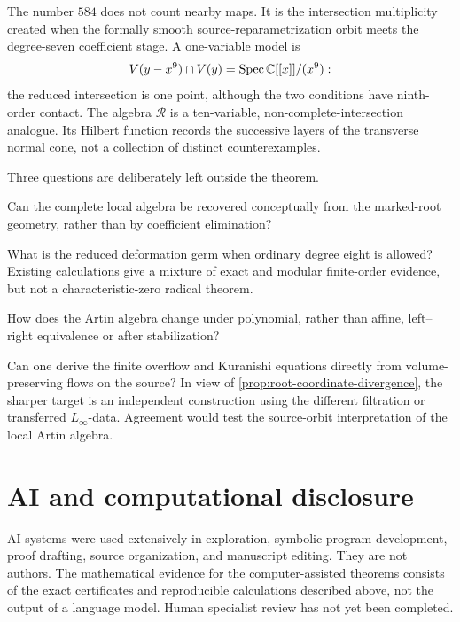 \documentclass[11pt,reqno]{amsart}
\begin{document}
The number \(584\) does not count nearby maps.  It is the intersection
multiplicity created when the formally smooth source-reparametrization orbit
meets the degree-seven coefficient stage.  A one-variable model is
\[
V(y-x^9)\cap V(y)
=\operatorname{Spec}\mathbb C[[x]]/(x^9):
\]
the reduced intersection is one point, although the two conditions have
ninth-order contact.  The algebra \(\mathcal R\) is a ten-variable,
non-complete-intersection analogue.  Its Hilbert function records the
successive layers of the transverse normal cone, not a collection of
distinct counterexamples.

Three questions are deliberately left outside the theorem.

\begin{question}
Can the complete local algebra be recovered conceptually from the
marked-root geometry, rather than by coefficient elimination?
\end{question}

\begin{question}
What is the reduced deformation germ when ordinary degree eight is allowed?
Existing calculations give a mixture of exact and modular finite-order
evidence, but not a characteristic-zero radical theorem.
\end{question}

\begin{question}
How does the Artin algebra change under polynomial, rather than affine,
left--right equivalence or after stabilization?
\end{question}

\begin{question}
\label{q:source-flow-verifier}
Can one derive the finite overflow and Kuranishi equations directly from
volume-preserving flows on the source?  In view of
\cref{prop:root-coordinate-divergence}, the sharper target is an independent
construction using the different filtration or transferred
\(L_\infty\)-data.  Agreement would test the source-orbit interpretation of
the local Artin algebra.
\end{question}

\appendix






\section*{AI and computational disclosure}

AI systems were used extensively in exploration, symbolic-program
development, proof drafting, source organization, and manuscript editing.
They are not authors.  The mathematical evidence for the computer-assisted
theorems consists of the exact certificates and reproducible calculations
described above, not the output of a language model.  Human specialist review
has not yet been completed.



\end{document}
